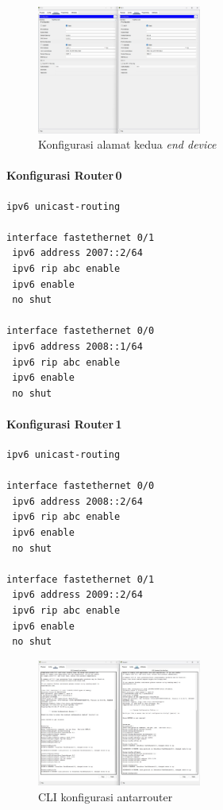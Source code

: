 \begin{figure}[H]
    \centering
    \includegraphics[width=0.48\textwidth]{img/TM6.jpeg}
    \caption{Konfigurasi alamat kedua \textit{end device}}
    \label{fig:tm6}
\end{figure}

\paragraph{Konfigurasi Router\,0}
\begin{verbatim}
ipv6 unicast-routing

interface fastethernet 0/1
 ipv6 address 2007::2/64
 ipv6 rip abc enable
 ipv6 enable
 no shut

interface fastethernet 0/0
 ipv6 address 2008::1/64
 ipv6 rip abc enable
 ipv6 enable
 no shut
\end{verbatim}

\paragraph{Konfigurasi Router\,1}
\begin{verbatim}
ipv6 unicast-routing

interface fastethernet 0/0
 ipv6 address 2008::2/64
 ipv6 rip abc enable
 ipv6 enable
 no shut

interface fastethernet 0/1
 ipv6 address 2009::2/64
 ipv6 rip abc enable
 ipv6 enable
 no shut
\end{verbatim}

\begin{figure}[H]
    \centering
    \includegraphics[width=0.48\textwidth]{img/TM7.jpeg}
    \caption{CLI konfigurasi antarr­outer}
    \label{fig:tm7}
\end{figure}

